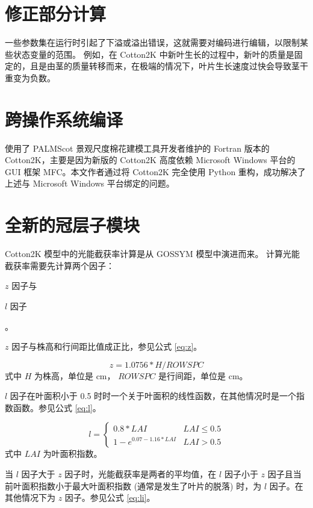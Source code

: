 \section{修正部分计算}
一些参数集在运行时引起了下溢或溢出错误，这就需要对编码进行编辑，以限制某些状态变量的范围。
例如，在 Cotton2K 中新叶生长的过程中，新叶的质量是固定的，且是由茎的质量转移而来，在极端的情况下，叶片生长速度过快会导致茎干重变为负数。

\section{跨操作系统编译}
 使用了 PALMScot 景观尺度棉花建模工具开发者维护的 Fortran 版本的 Cotton2K，主要是因为新版的 Cotton2K 高度依赖%
Microsoft Windows 平台的 GUI 框架 MFC。本文作者通过将 Cotton2K 完全使用 Python 重构，成功解决了上述与 Microsoft Windows 平台绑定的问题。

\section{全新的冠层子模块}
Cotton2K 模型中的光能截获率计算是从 GOSSYM 模型中演进而来。
计算光能截获率需要先计算两个因子：\begin{enumerate*}
    \item $z$ 因子与
    \item $l$ 因子
\end{enumerate*}。

$z$ 因子与株高和行间距比值成正比，参见公式 \ref{eq:z}。

\begin{equation}\label{eq:z}
    z = 1.0756 * H / ROWSPC
\end{equation}
式中 $H$ 为株高，单位是 cm， $ROWSPC$ 是行间距，单位是 cm。

$l$ 因子在叶面积小于 0.5 时时一个关于叶面积的线性函数，在其他情况时是一个指数函数。参见公式 \ref{eq:l}。

\begin{equation}\label{eq:l}
    l = \begin{cases}
        0.8 * LAI                 & LAI \le 0.5 \\
        1 - e^{0.07 - 1.16 * LAI} & LAI > 0.5
    \end{cases}
\end{equation}
式中 $LAI$ 为叶面积指数。

当 $l$ 因子大于 $z$ 因子时，光能截获率是两者的平均值，在 $l$ 因子小于 $z$ 因子且当前叶面积指数小于最大叶面积指数
(通常是发生了叶片的脱落) 时，为 $l$ 因子。在其他情况下为 $z$ 因子。参见公式 \ref{eq:li}。


